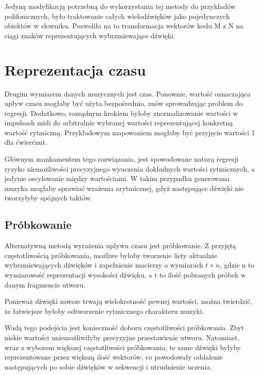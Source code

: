 {{{            Jedyną modyfikacją potrzebną do wykorzystania tej metody do przykładów polifonicznych, było traktowanie 
            całych wielodźwięków jako pojedynczych obiektów w słowniku. Pozwoliła na to transformacja wektorów kodu 
             M\,\,z\,\,N na ciągi znaków reprezentujących wybrzmiewające dźwięki.
        }
    }

    \section{Reprezentacja czasu}
    {
        Drugim wymiarem danych muzycznych jest czas. Ponownie, wartość oznaczająca upływ czasu
        mogłaby być użyta bezpośrednio, znów sprowadzając problem do regresji. Dodatkowo, rozsądnym krokiem
        byłoby znormalizowanie wartości w impulsach midi do arbitralnie wybranej wartości reprezentującej konkretną
        wartość rytmiczną. Przykładowym mapowaniem mogłoby być przyjęcie wartości 1 dla ćwierćnut.

        Głównym mankamentem tego rozwiązania, jest spowodowane naturą regresji ryzyko niemożliwości precyzyjnego wyuczenia 
        dokładnych wartości rytmicznych, a jedynie oscylowanie między wartościami. W takim przypadku generowana muzyka
        mogłaby sprawiać wrażenia arytmicznej, gdyż następujące dźwięki nie tworzyłyby spójnych taktów. 

        \subsection{Próbkowanie}\label{sec:samle_time}
        {
            Alternatywną metodą wyrażenia upływu czasu jest próbkowanie. Z przyjętą częstotliwością próbkowania, 
            możliwe byłoby tworzenie listy aktualnie wybrzmiewających dźwięków i zapełnienie macierzy o wymiarach \(t \times n\), gdzie n to
            wymiarowość reprezentacji wysokości dźwięku, a t to ilość pobranych próbek w danym fragmencie utworu.
            
            Ponieważ dźwięki zawsze trwają wielokrotność pewnej wartości, można twierdzić, że łatwiejsze byłoby 
            odtworzenie rytmicznego charakteru muzyki.
            
            Wadą tego podejścia jest konieczność doboru częstotliwości próbkowania. Zbyt niskie wartości 
            uniemożliwiłyby precyzyjne przestawienie utworu. Natomiast, wraz z wyborem większej częstotliwości próbkowania,
            te same dźwięki byłyby reprezentowane przez większą ilość wektorów, 
            co powodowały oddalenie następujących po sobie dźwięków w sekwencji i utrudnienie uczenia.
        }

}}
